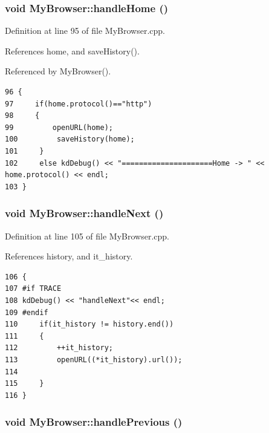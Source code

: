 \subsubsection{\setlength{\rightskip}{0pt plus 5cm}void My\-Browser::handle\-Home ()\hspace{0.3cm}{\tt  [slot]}}\label{classMyBrowser_MyBrowseri0}




Definition at line 95 of file My\-Browser.cpp.

References home, and save\-History().

Referenced by My\-Browser().



\footnotesize\begin{verbatim}96 {
97     if(home.protocol()=="http")
98     {
99         openURL(home);
100         saveHistory(home);
101     }   
102     else kdDebug() << "=====================Home -> " << home.protocol() << endl;
103 }
\end{verbatim}\normalsize 
{}
\subsubsection{\setlength{\rightskip}{0pt plus 5cm}void My\-Browser::handle\-Next ()\hspace{0.3cm}{\tt  [slot]}}\label{classMyBrowser_MyBrowseri2}




Definition at line 105 of file My\-Browser.cpp.

References history, and it\_\-history.



\footnotesize\begin{verbatim}106 {
107 #if TRACE 
108 kdDebug() << "handleNext"<< endl;
109 #endif
110     if(it_history != history.end())
111     {
112         ++it_history;
113         openURL((*it_history).url());
114 
115     }   
116 }
\end{verbatim}\normalsize 
{}
\subsubsection{\setlength{\rightskip}{0pt plus 5cm}void My\-Browser::handle\-Previous ()\hspace{0.3cm}{\tt  [slot]}}\label{classMyBrowser_MyBrowseri3}




